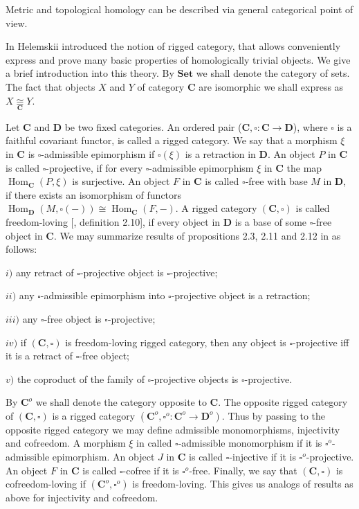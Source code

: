 \documentclass[12pt]{article}
\newcommand{\isom}[1]{\mathop{\mathbin{\cong}}\limits_{#1}}
\begin{document}
Metric and topological homology can be described via general categorical point of view.

In \cite{HelMetrFrQMod} Helemskii introduced the notion of rigged category, that allows conveniently express and prove many basic properties of homologically trivial objects. We give a brief introduction into this theory. By $\mathbf{Set}$ we shall denote the category of sets. The fact that objects $X$ and $Y$ of category $\mathbf{C}$ are isomorphic we shall express as $X\isom{\mathbf{C}}Y$.

Let $\mathbf{C}$ and $\mathbf{D}$ be two fixed categories. An ordered pair ($\mathbf{C}, \square:\mathbf{C}\to\mathbf{D}$), where $\square$ is a faithful covariant functor, is called a rigged category. We say that a morphism $\xi$ in $\mathbf{C}$ is $\square$-admissible epimorphism if $\square (\xi)$ is a retraction in $\mathbf{D}$. An object $P$ in $\mathbf{C}$ is called $\square$-projective, if for every $\square$-admissible epimorphism $\xi$ in $\mathbf{C}$ the map $\operatorname{Hom}_{\mathbf{C}}(P,\xi)$ is surjective. An object $F$ in $\mathbf{C}$ is called $\square$-free with base $M$ in  $\mathbf{D}$, if there exists an isomorphism of functors $\operatorname{Hom}_{\mathbf{D}}(M,\square(-))\cong\operatorname{Hom}_{\mathbf{C}}(F,-)$. A rigged category $(\mathbf{C},\square)$ is called  freedom-loving [\cite{HelMetrFrQMod}, definition 2.10], if every object in $\mathbf{D}$ is a base of some $\square$-free object in $\mathbf{C}$. We may summarize results of propositions 2.3, 2.11  and 2.12 in \cite{HelMetrFrQMod} as follows:

$i)$ any retract of $\square$-projective object is $\square$-projective;

$ii)$ any $\square$-admissible epimorphism into $\square$-projective object is a retraction;

$iii)$ any $\square$-free object is $\square$-projective;

$iv)$ if $(\mathbf{C},\square)$ is freedom-loving rigged category, then any object is $\square$-projective iff it is a retract of $\square$-free object;

$v)$ the coproduct of the family of $\square$-projective objects is $\square$-projective.

By $\mathbf{C}^{o}$ we shall denote the category opposite to $\mathbf{C}$. The opposite rigged category of $(\mathbf{C}, \square)$ 
is a rigged category $(\mathbf{C}^{o},\square^{o}:\mathbf{C}^{o}\to\mathbf{D}^{o})$. 
Thus by passing to the opposite rigged category we may define admissible monomorphisms, injectivity and cofreedom. A morphism $\xi$ in called $\square$-admissible monomorphism if it is $\square^o$-admissible epimorphism. An object $J$ in $\mathbf{C}$ is called $\square$-injective if it is $\square^o$-projective. An object $F$ in $\mathbf{C}$ is called $\square$-cofree if it is $\square^o$-free. Finally, we say that $(\mathbf{C}, \square)$ is cofreedom-loving if $(\mathbf{C}^{o}, \square^{o})$ is freedom-loving. This gives us analogs of results as above for injectivity and cofreedom.
\end{document}
